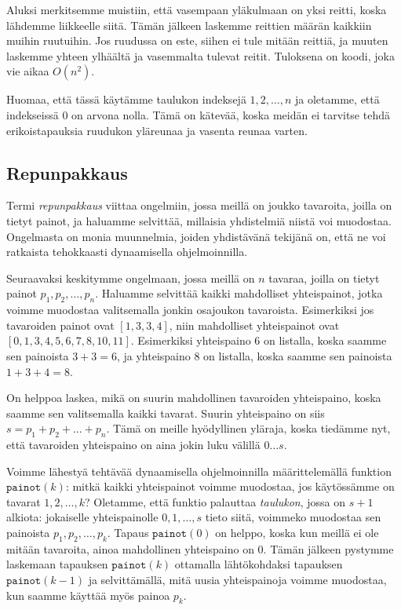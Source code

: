 Aluksi merkitsemme muistiin, että vasempaan yläkulmaan on yksi reitti,
koska lähdemme liikkeelle siitä.
Tämän jälkeen laskemme reittien määrän kaikkiin muihin ruutuihin.
Jos ruudussa on este, siihen ei tule mitään reittiä,
ja muuten laskemme yhteen ylhäältä ja vasemmalta tulevat reitit.
Tuloksena on koodi, joka vie aikaa $O(n^2)$.

Huomaa, että tässä käytämme taulukon indeksejä $1,2,\dots,n$
ja oletamme, että indekseissä $0$ on arvona nolla.
Tämä on kätevää, koska meidän ei tarvitse tehdä erikoistapauksia
ruudukon yläreunaa ja vasenta reunaa varten.

\subsection{Repunpakkaus}

Termi \emph{repunpakkaus} viittaa ongelmiin, jossa meillä on joukko
tavaroita, joilla on tietyt painot, 
ja haluamme selvittää, millaisia yhdistelmiä niistä voi muodostaa.
Ongelmasta on monia muunnelmia, joiden yhdistävänä tekijänä on,
että ne voi ratkaista tehokkaasti dynaamisella ohjelmoinnilla.

Seuraavaksi keskitymme ongelmaan, jossa meillä on $n$ tavaraa,
joilla on tietyt painot $p_1,p_2,\dots,p_n$.
Haluamme selvittää kaikki mahdolliset yhteispainot,
jotka voimme muodostaa valitsemalla jonkin osajoukon tavaroista.
Esimerkiksi jos tavaroiden painot ovat $[1,3,3,4]$,
niin mahdolliset yhteispainot ovat $[0,1,3,4,5,6,7,8,10,11]$.
Esimerkiksi yhteispaino $6$ on listalla,
koska saamme sen painoista $3+3=6$,
ja yhteispaino $8$ on listalla,
koska saamme sen painoista $1+3+4=8$.

On helppoa laskea, mikä on suurin mahdollinen tavaroiden yhteispaino,
koska saamme sen valitsemalla kaikki tavarat.
Suurin yhteispaino on siis $s=p_1+p_2+\dots+p_n$.
Tämä on meille hyödyllinen yläraja, koska tiedämme nyt,
että tavaroiden yhteispaino on aina jokin luku välillä $0 \dots s$.

Voimme lähestyä tehtävää dynaamisella ohjelmoinnilla määrittelemällä
funktion $\texttt{painot}(k)$: mitkä kaikki yhteispainot voimme
muodostaa, jos käytös\-sämme on tavarat $1,2,\dots,k$?
Oletamme, että funktio palauttaa \emph{taulukon}, jossa on $s+1$ alkiota:
jokaiselle yhteispainolle $0,1,\dots,s$ tieto siitä,
voimmeko muodostaa sen painoista $p_1,p_2,\dots,p_k$.
Tapaus $\texttt{painot}(0)$ on helppo,
koska kun meillä ei ole mitään tavaroita,
ainoa mahdollinen yhteispaino on $0$.
Tämän jälkeen pystymme laskemaan tapauksen $\texttt{painot}(k)$
ottamalla lähtökohdaksi tapauksen $\texttt{painot}(k-1)$
ja selvittämällä, mitä uusia yhteispainoja voimme muodostaa,
kun saamme käyttää myös painoa $p_k$.

